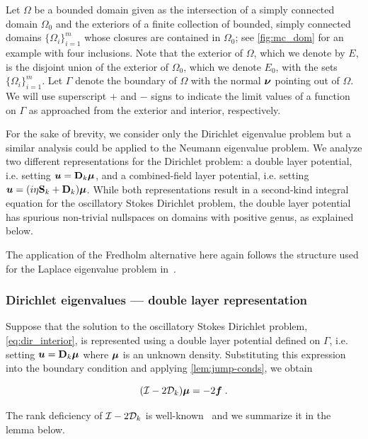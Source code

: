 Let $\Omega$ be a bounded domain given as
the intersection of a simply connected domain $\Omega_0$ and
the exteriors of a finite collection of bounded,
simply connected domains $\{ \Omega_i \}_{i=1}^m$
whose closures are contained in $\Omega_0$;
see \cref{fig:mc_dom} for an example with four inclusions.
Note that the
exterior of $\Omega$, which we denote by $E$, is the
disjoint union of the exterior of $\Omega_0$, which we
denote $E_0$, with the sets $\{ \Omega_i \}_{i=1}^m$.
Let $\Gamma$ denote the boundary of $\Omega$ with the normal
${\boldsymbol \nu}$ pointing out of $\Omega$.
We will use superscript $+$ and $-$ signs
to indicate the limit values of a function on $\Gamma$
as approached from the exterior and interior, respectively.

For the sake of brevity, we consider only the
Dirichlet eigenvalue problem but a similar analysis
could be applied to the Neumann eigenvalue problem.
We analyze two different representations for the
Dirichlet problem: a double layer potential,
i.e. setting ${\boldsymbol u}={\bf D}_{k} {\boldsymbol \mu}$, and a combined-field
layer potential, i.e. setting
${\boldsymbol u}=(i\eta {\bf S}_{k} + {\bf D}_{k}){\boldsymbol \mu}$. 
While both representations result in a second-kind
integral equation for the oscillatory Stokes Dirichlet
problem, the double layer potential has spurious non-trivial
nullspaces on domains with positive genus, as
explained below.

\begin{remark}
  The application of the Fredholm alternative here
  again follows the structure used for the Laplace
  eigenvalue problem in~\cite[Ch. 3]{colton1983integral}.
\end{remark}


\subsubsection{Dirichlet eigenvalues --- double layer
  representation}
\label{subsec:dlanalysis}
Suppose that the solution to the oscillatory
Stokes Dirichlet problem, \cref{eq:dir_interior},
is represented using a double layer potential defined
on $\Gamma$, i.e. setting ${\boldsymbol u} = {\bf D}_{k} {\boldsymbol \mu}$ where
${\boldsymbol \mu}$ is an unknown density. 
Substituting this expression
into the boundary condition and applying
\cref{lem:jump-conds}, we obtain

\begin{equation}
  (\mathcal I - 2{\mathcal D}_{k}) {\boldsymbol \mu} = -2{\boldsymbol f} \; . \label{eq:inteq_dir_int}
\end{equation}

The rank deficiency of $\mathcal I-2{\mathcal D}_{k}$ is
well-known~\cite{biros2002embedded} and we summarize it
in the lemma below.

